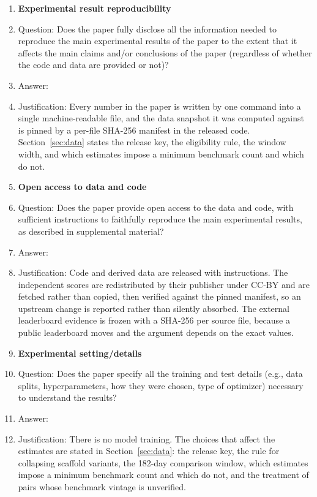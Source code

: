 \documentclass{article}
\begin{document}
\begin{enumerate}
    \item {\bf Experimental result reproducibility}
    \item[] Question: Does the paper fully disclose all the information needed to reproduce the main experimental results of the paper to the extent that it affects the main claims and/or conclusions of the paper (regardless of whether the code and data are provided or not)?
    \item[] Answer: \answerYes{}
    \item[] Justification: Every number in the paper is written by one command into a single machine-readable file, and the data snapshot it was computed against is pinned by a per-file SHA-256 manifest in the released code. Section~\ref{sec:data} states the release key, the eligibility rule, the window width, and which estimates impose a minimum benchmark count and which do not.



\item {\bf Open access to data and code}
    \item[] Question: Does the paper provide open access to the data and code, with sufficient instructions to faithfully reproduce the main experimental results, as described in supplemental material?
    \item[] Answer: \answerYes{}
    \item[] Justification: Code and derived data are released with instructions. The independent scores are redistributed by their publisher under CC-BY and are fetched rather than copied, then verified against the pinned manifest, so an upstream change is reported rather than silently absorbed. The external leaderboard evidence is frozen with a SHA-256 per source file, because a public leaderboard moves and the argument depends on the exact values.



\item {\bf Experimental setting/details}
    \item[] Question: Does the paper specify all the training and test details (e.g., data splits, hyperparameters, how they were chosen, type of optimizer) necessary to understand the results?
    \item[] Answer: \answerYes{}
    \item[] Justification: There is no model training. The choices that affect the estimates are stated in Section~\ref{sec:data}: the release key, the rule for collapsing scaffold variants, the 182-day comparison window, which estimates impose a minimum benchmark count and which do not, and the treatment of pairs whose benchmark vintage is unverified.



\end{enumerate}
\end{document}
